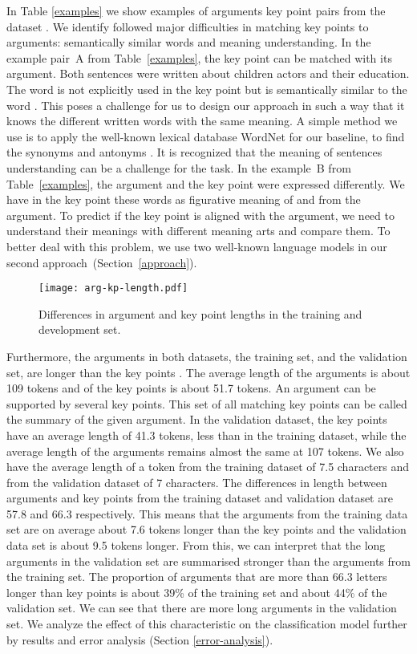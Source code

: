 In Table \ref{examples} we show examples of arguments key point pairs from the \ArgKP dataset \cite{Bar-HaimEFKLS2020}. 
We identify followed major difficulties in matching key points to arguments: semantically similar words and meaning understanding.
In the example pair~A from Table~\ref{examples}, the key point can be matched with its argument. Both sentences were written about children actors and their education. The word  is not explicitly used in the key point but is semantically similar to the word . 
This poses a challenge for us to design our approach in such a way that it knows the different written words with the same meaning. 
A simple method we use is to apply the well-known lexical database WordNet for our baseline, to find the synonyms and antonyms \cite{Miller1995}.
It is recognized that the meaning of sentences understanding can be a challenge for the task. 
In the example~B from Table~\ref{examples}, the argument and the key point were expressed differently. 
We have in the key point these words  as figurative meaning of  and  from the argument. 
To predict if the key point is aligned with the argument, we need to understand their meanings with different meaning arts and compare them. 
To better deal with this problem, we use two well-known language models in our second approach~(Section~\ref{approach}). 

\begin{figure*}
    \centering
    \texttt{[image: arg-kp-length.pdf]}
    \label{arg-kp-length}
    \caption{Differences in argument and key point lengths in the training and development set.}
\end{figure*}

Furthermore, the arguments in both datasets, the training set, and the validation set, are longer than the key points . 
The average length of the arguments is about 109 tokens and of the key points is about 51.7 tokens. 
An argument can be supported by several key points. This set of all matching key points can be called the summary of the given argument.  
In the validation dataset, the key points have an average length of 41.3 tokens, less than in the training dataset, while the average length of the arguments remains almost the same at 107 tokens. 
We also have the average length of a token from the training dataset of 7.5 characters and from the validation dataset of 7 characters. 
The differences in length between arguments and key points from the training dataset and validation dataset are 57.8 and 66.3 respectively. 
This means that the arguments from the training data set are on average about 7.6 tokens longer than the key points and the validation data set is about 9.5 tokens longer. 
From this, we can interpret that the long arguments in the validation set are summarised stronger than the arguments from the training set. 
The proportion of arguments that are more than 66.3 letters longer than key points is about 39\% of the training set and about 44\% of the validation set. We can see that there are more long arguments in the validation set. 
We analyze the effect of this characteristic on the classification model further by results and error analysis (Section \ref{error-analysis}).
